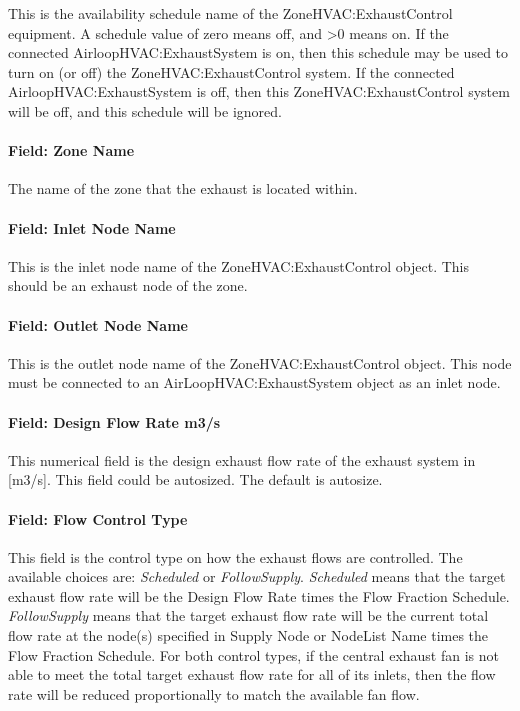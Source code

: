 This is the availability schedule name of the ZoneHVAC:ExhaustControl equipment. A schedule value of zero means off, and >0 means on. If the connected AirloopHVAC:ExhaustSystem is on, then this schedule may be used to turn on (or off) the ZoneHVAC:ExhaustControl system. If the connected AirloopHVAC:ExhaustSystem is off, then this ZoneHVAC:ExhaustControl system will be off, and this schedule will be ignored.

\paragraph{Field: Zone Name}

The name of the zone that the exhaust is located within.

\paragraph{Field: Inlet Node Name}

This is the inlet node name of the ZoneHVAC:ExhaustControl object. This should be an exhaust node of the zone.

\paragraph{Field: Outlet Node Name}

This is the outlet node name of the ZoneHVAC:ExhaustControl object. This node must be connected to an AirLoopHVAC:ExhaustSystem object as an inlet node.

\paragraph{Field: Design Flow Rate {m3/s}}

This numerical field is the design exhaust flow rate of the exhaust system in [m3/s]. This field could be autosized. The default is autosize.

\paragraph{Field: Flow Control Type}

This field is the control type on how the exhaust flows are controlled. The available choices are: \emph{Scheduled} or \emph{FollowSupply}. \emph{Scheduled} means that the target exhaust flow rate will be the Design Flow Rate times the Flow Fraction Schedule. \emph{FollowSupply} means that the target exhaust flow rate will be the current total flow rate at the node(s) specified in Supply Node or NodeList Name times the Flow Fraction Schedule. For both control types, if the central exhaust fan is not able to meet the total target exhaust flow rate for all of its inlets, then the flow rate will be reduced proportionally to match the available fan flow.

